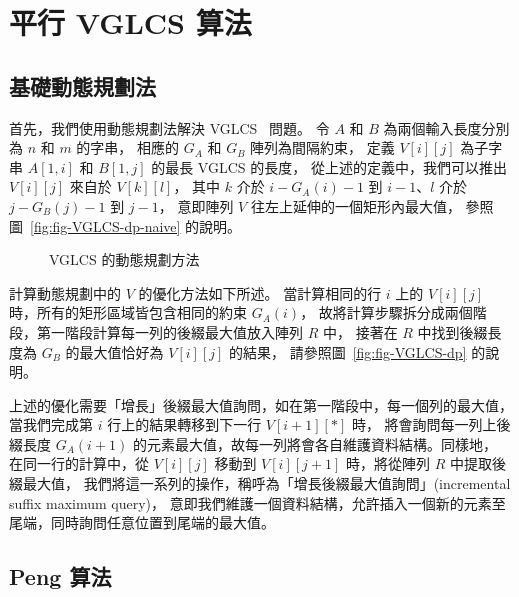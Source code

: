 \section{平行 VGLCS 算法} \label{sec:parallelVGLCS}

\subsection{基礎動態規劃法}

首先，我們使用動態規劃法解決 VGLCS~\cite{Peng2011TheLC} 問題。
令 $A$ 和 $B$ 為兩個輸入長度分別為 $n$ 和 $m$ 的字串，
相應的 $G_A$ 和 $G_B$ 陣列為間隔約束，
定義 $V[i][j]$ 為子字串 $A[1, i]$ 和 $B[1, j]$ 的最長 VGLCS 的長度，
從上述的定義中，我們可以推出 $V[i][j]$ 來自於 $V[k][l]$，
其中 $k$ 介於 $i-G_A(i)-1$ 到 $i-1$、$l$ 介於 $j-G_B(j)-1$ 到 $j-1$，
意即陣列 $V$ 往左上延伸的一個矩形內最大值，
參照圖~\ref{fig:fig-VGLCS-dp-naive} 的說明。

\begin{figure}[!thb]
  \centering {} 
  \caption{VGLCS 的動態規劃方法}
  \label{fig:basic-dp-VGLCS}
\end{figure}

計算動態規劃中的 $V$ 的優化方法如下所述。
當計算相同的行 $i$ 上的 $V[i][j]$ 時，所有的矩形區域皆包含相同的約束 $G_A(i)$，
故將計算步驟拆分成兩個階段，第一階段計算每一列的後綴最大值放入陣列 $R$ 中，
接著在 $R$ 中找到後綴長度為 $G_B$ 的最大值恰好為 $V[i][j]$ 的結果，
請參照圖~\ref{fig:fig-VGLCS-dp} 的說明。

上述的優化需要「增長」後綴最大值詢問，如在第一階段中，每一個列的最大值，
當我們完成第 $i$ 行上的結果轉移到下一行 $V[i+1][*]$ 時，
將會詢問每一列上後綴長度 $G_A(i+1)$ 的元素最大值，故每一列將會各自維護資料結構。同樣地，
在同一行的計算中，從 $V[i][j]$ 移動到 $V[i][j+1]$ 時，將從陣列 $R$ 中提取後綴最大值，
我們將這一系列的操作，稱呼為「增長後綴最大值詢問」(incremental suffix maximum query)，
意即我們維護一個資料結構，允許插入一個新的元素至尾端，同時詢問任意位置到尾端的最大值。


\subsection{Peng 算法}

